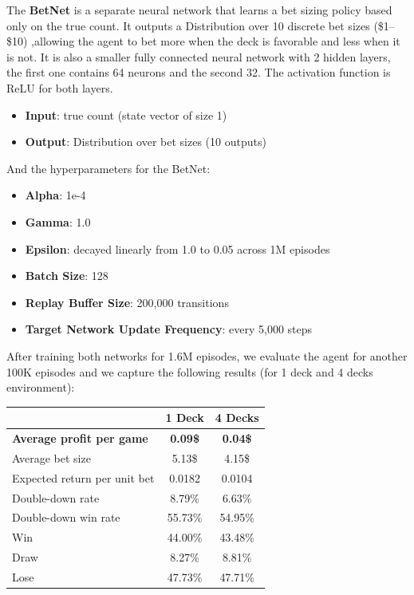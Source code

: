 \documentclass{article}
\begin{document}
\vspace{1em}

\noindent The {\bf BetNet} is a separate neural network that learns a bet sizing policy 
based only on the true count.
It outputs a Distribution over 10 discrete bet sizes (\$1–\$10) ,allowing 
the agent to bet more when the deck is favorable and less when it is not.
It is also a smaller fully connected neural network with 2 hidden layers,
the first one contains 64 neurons and the second 32. 
The activation function is ReLU for both layers.
\begin{itemize}
  \item {\bf Input}: true count (state vector of size 1)
  \item {\bf Output}: Distribution over bet sizes (10 outputs)
\end{itemize}

\noindent And the hyperparameters for the BetNet:
\begin{itemize}
  \item {\bf Alpha}: 1e-4 
  \item {\bf Gamma}: 1.0
  \item {\bf Epsilon}: decayed linearly from 1.0 to 0.05 across 1M episodes
  \item {\bf Batch Size}: 128
  \item {\bf Replay Buffer Size}: 200,000 transitions
  \item {\bf Target Network Update Frequency}: every 5,000 steps
\end{itemize}

\noindent After training both networks for 1.6M episodes, we evaluate the agent for
another 100K episodes and we capture the following results (for 1 deck
and 4 decks environment):

\begin{table}[h!]
\centering
\begin{tabular}{|l|c|c|}
\hline
 & \textbf{1 Deck} & \textbf{4 Decks} \\
\hline
{\bf Average profit per game} & {\bf 0.09\$} & {\bf 0.04\$} \\
Average bet size & 5.13\$ & 4.15\$ \\
Expected return per unit bet & 0.0182 &  0.0104\\
Double-down rate & 8.79\% & 6.63\% \\
Double-down win rate & 55.73\% & 54.95\% \\
Win & 44.00\% & 43.48\% \\
Draw & 8.27\% & 8.81\% \\
Lose & 47.73\% & 47.71\% \\
\hline
\end{tabular}
\end{table}
\end{document}
